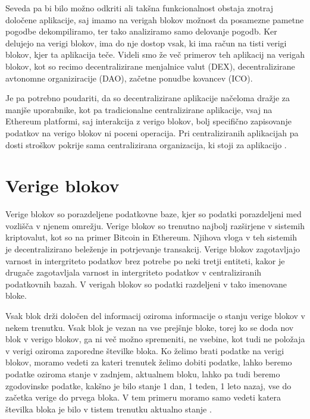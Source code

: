 \documentclass[a4paper,12pt,openright]{book}
\begin{document}
Seveda pa bi bilo možno odkriti ali takšna funkcionalnost obstaja znotraj določene aplikacije, 
saj imamo na verigah blokov možnost da posamezne pametne pogodbe dekompiliramo, ter tako analiziramo samo delovanje pogodb.
Ker delujejo na verigi blokov, ima do nje dostop vsak, ki ima račun na tisti verigi blokov, kjer ta aplikacija teče.
Videli smo že več primerov teh aplikacij na verigah blokov, kot so recimo decentralizirane menjalnice valut (DEX),
decentralizirane avtonomne organiziracije (DAO), začetne ponudbe kovancev (ICO).

Je pa potrebno poudariti, da so decentralizirane aplikacije načeloma dražje za manjše uporabnike, kot pa tradicionalne centralizirane aplikacije, 
vsaj na Ethereum platformi, saj interakcija z verigo blokov, bolj specifično zapisovanje podatkov na verigo blokov ni poceni operacija.
Pri centraliziranih aplikacijah pa dosti stroškov pokrije sama centralizirana organizacija, ki stoji za aplikacijo \cite{dapps_investopedia} \cite{51_attack_investopedia}.


\section{Verige blokov}
Verige blokov so porazdeljene podatkovne baze, kjer so podatki porazdeljeni med vozlišča v njenem omrežju.
Verige blokov so trenutno najbolj razširjene v sistemih kriptovalut, kot so na primer Bitcoin in Ethereum.
Njihova vloga v teh sistemih je decentralizirano beleženje in potrjevanje transakcij.
Verige blokov zagotavljajo varnost in intergriteto podatkov brez potrebe po neki tretji entiteti, kakor je drugače zagotavljala varnost in intergriteto podatkov v centraliziranih podatkovnih bazah.
V verigah blokov so podatki razdeljeni v tako imenovane bloke.

Vsak blok drži določen del informacij oziroma informacije o stanju verige blokov v nekem trenutku.
Vsak blok je vezan na vse prejšnje bloke, torej ko se doda nov blok v verigo blokov, ga ni več možno spremeniti, ne vsebine, kot tudi ne položaja v verigi oziroma zaporedne številke bloka.
Ko želimo brati podatke na verigi blokov, moramo vedeti za kateri trenutek želimo dobiti podatke, lahko beremo podatke oziroma stanje v zadnjem, aktualnem bloku, 
lahko pa tudi beremo zgodovinske podatke, kakšno je bilo stanje 1 dan, 1 teden, 1 leto nazaj, vse do začetka verige do prvega bloka.
V tem primeru moramo samo vedeti katera številka bloka je bilo v tistem trenutku aktualno stanje \cite{blockchain_explained_investopedia}.
\end{document}

